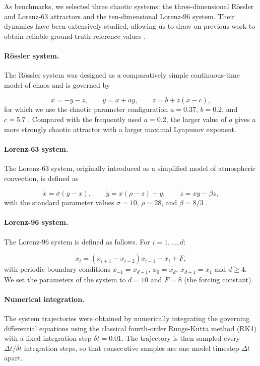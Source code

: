 \documentclass{article}
\begin{document}
As benchmarks, we selected three chaotic systems: the three-dimensional Rössler and Lorenz-63 attractors and the ten-dimensional Lorenz-96 system. Their dynamics have been extensively studied, allowing us to draw on previous work to obtain reliable ground-truth reference values \cite{ayers_supervised_2023}.

\paragraph{Rössler system.}
The Rössler system was designed as a comparatively simple continuous-time model of chaos and is governed by

\begin{equation}
    \dot{x}=-y-z, \qquad
    \dot{y}=x+ay, \qquad
    \dot{z}=b+z(x-c),
\end{equation}
for which we use the chaotic parameter configuration $a=0.37$, $b=0.2$, and $c=5.7$ \cite{rossler_equation_1976}. Compared with the frequently used $a=0.2$, the larger value of $a$ gives a more strongly chaotic attractor with a larger maximal Lyapunov exponent.

\paragraph{Lorenz-63 system.}
The Lorenz-63 system, originally introduced as a simplified model of atmospheric convection, is defined as

\begin{equation}
    \dot{x}=\sigma(y-x), \qquad
    \dot{y}=x(\rho-z)-y, \qquad
    \dot{z}=xy-\beta z,
\end{equation}
with the standard parameter values $\sigma=10$, $\rho=28$, and $\beta=8/3$ \cite{lorenz_deterministic_1963}.

\paragraph{Lorenz-96 system.}
The Lorenz-96 system is defined as follows. For $i = 1, \dots, d$:

\begin{equation}
    \dot{x}_i = (x_{i+1} - x_{i-2})x_{i-1} - x_i + F,
\end{equation}
with periodic boundary conditions $x_{-1} = x_{d-1}$, $x_0 = x_d$, $x_{d+1} = x_1$ and $d \geq 4$. We set the parameters of the system to $d = 10$ and $F = 8$ (the forcing constant).

\paragraph{Numerical integration.}
The system trajectories were obtained by numerically integrating the governing differential equations using the classical fourth-order Runge-Kutta method (RK4) with a fixed integration step $\delta t = 0.01$. The trajectory is then sampled every $\Delta t / \delta t$ integration steps, so that consecutive samples are one model timestep $\Delta t$ apart.
\end{document}
